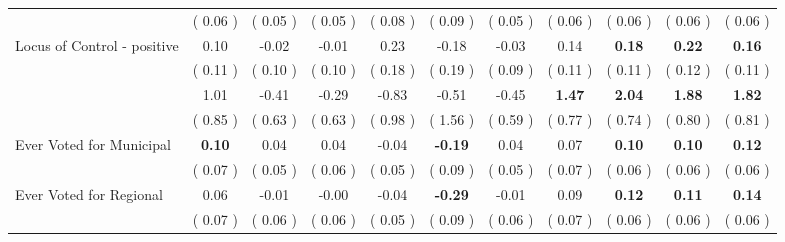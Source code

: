 \begin{tabular}{l c c c c c c c c c c}
& (     0.06 ) & (     0.05 ) & (     0.05 ) & (     0.08 ) & (     0.09 ) & (     0.05 ) & (     0.06 ) & (     0.06 ) & (     0.06 ) & (     0.06 ) \\
Locus of Control - positive &      0.10 &     -0.02 &     -0.01 &      0.23 &     -0.18 &     -0.03 &      0.14 & \textbf{      0.18 } & \textbf{      0.22 } & \textbf{     0.16} \\
& (     0.11 ) & (     0.10 ) & (     0.10 ) & (     0.18 ) & (     0.19 ) & (     0.09 ) & (     0.11 ) & (     0.11 ) & (     0.12 ) & (     0.11 ) \\
&      1.01 &     -0.41 &     -0.29 &     -0.83 &     -0.51 &     -0.45 & \textbf{      1.47 } & \textbf{      2.04 } & \textbf{      1.88 } & \textbf{     1.82} \\
& (     0.85 ) & (     0.63 ) & (     0.63 ) & (     0.98 ) & (     1.56 ) & (     0.59 ) & (     0.77 ) & (     0.74 ) & (     0.80 ) & (     0.81 ) \\
Ever Voted for Municipal & \textbf{      0.10 } &      0.04 &      0.04 &     -0.04 & \textbf{     -0.19 } &      0.04 &      0.07 & \textbf{      0.10 } & \textbf{      0.10 } & \textbf{     0.12} \\
& (     0.07 ) & (     0.05 ) & (     0.06 ) & (     0.05 ) & (     0.09 ) & (     0.05 ) & (     0.07 ) & (     0.06 ) & (     0.06 ) & (     0.06 ) \\
Ever Voted for Regional &      0.06 &     -0.01 &     -0.00 &     -0.04 & \textbf{     -0.29 } &     -0.01 &      0.09 & \textbf{      0.12 } & \textbf{      0.11 } & \textbf{     0.14} \\
& (     0.07 ) & (     0.06 ) & (     0.06 ) & (     0.05 ) & (     0.09 ) & (     0.06 ) & (     0.07 ) & (     0.06 ) & (     0.06 ) & (     0.06 ) \\
\bottomrule
\end{tabular}
